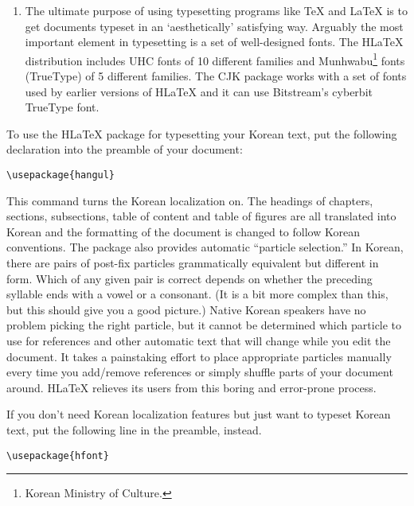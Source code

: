 \begin{enumerate}
The CJK package is not specific to Korean. It can
process input files in UTF-8 as well as in various CJK encodings
including EUC-KR and CP949/Windows-949/UHC, it can be used to typeset documents with
multilingual content (especially Chinese, Japanese and Korean).
The CJK package has no Korean localization such as the one offered by H\LaTeX{} and it
does not come with as many special Korean fonts as H\LaTeX.

\item The ultimate purpose of using typesetting programs like \TeX{}
and \LaTeX{} is to get documents typeset in an `aesthetically' satisfying way.
Arguably the most important element in typesetting is  a set of
well-designed fonts. The H\LaTeX{} distribution
includes UHC \PSi{} fonts 
of 10
different families and
Munhwabu\footnote{Korean Ministry of Culture.}
fonts (TrueType) of 5 different families.
The CJK package works with a set of fonts used by earlier versions
of H\LaTeX{} and it can use Bitstream's cyberbit TrueType
font.
\end{enumerate}

To use the  H\LaTeX{} package for typesetting your Korean text, put the following
declaration into the preamble of your document:
\begin{lscommand}
\verb+\usepackage{hangul}+
\end{lscommand}

This command turns the Korean localization on. The headings
of chapters, sections, subsections, table of content and table of
figures are all translated into Korean and the formatting of the document
is changed to follow Korean conventions. 
The package also provides automatic ``particle selection.''
In Korean, there are pairs of post-fix particles 
grammatically equivalent but different in form. Which 
of any given pair is correct depends on 
whether the preceding syllable ends with a  vowel or a consonant.
(It is a bit more complex than this, but this should give you
a good picture.)
Native Korean speakers have no problem picking the right particle, but
it cannot be determined which particle to use for references and other automatic
text that will change while you edit the document.
It 
takes a painstaking effort to place appropriate particles manually
every time you add/remove references or simply shuffle  parts
of your document around.
H\LaTeX{} relieves its users from this boring and error-prone process.

If you don't need Korean localization features
but just want 
to  typeset Korean text, put the following line in the 
preamble, instead.
\begin{lscommand}
\verb+\usepackage{hfont}+
\end{lscommand}


